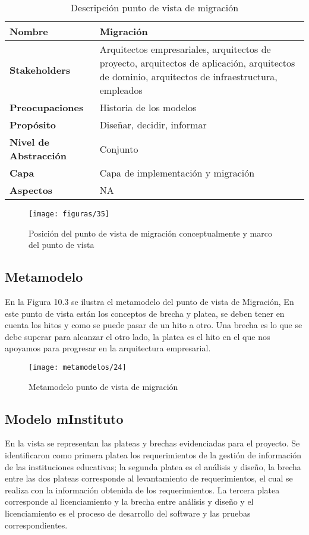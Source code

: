   \begin{table}[H]
	\centering
	\begin{tabular}{p{3.7cm}p{8cm}}
		\hline
		\rowcolor[HTML]{0073a1}
		{\color[HTML]{FFFFFF} \textbf{Nombre}} & {\color[HTML]{FFFFFF} \textbf{Migración}} \\
		\hline
		\textbf{Stakeholders} & Arquitectos empresariales, arquitectos de proyecto, arquitectos de aplicación, arquitectos de dominio, arquitectos de infraestructura, empleados \\
		\textbf{Preocupaciones} & Historia de los modelos \\
		\textbf{Propósito} & Diseñar, decidir, informar \\
		\textbf{Nivel de Abstracción} & Conjunto \\
		\textbf{Capa} & Capa de implementación y migración \\
		\textbf{Aspectos} & NA \\
		\bottomrule
	\end{tabular}
	\captionsetup{width=.95\textwidth}
	\caption{Descripción punto de vista de migración}
	\label{tabla27}
  \end{table}

  \begin{figure}[H]
	\centering
	\texttt{[image: figuras/35]}
	\captionsetup{width=.95\textwidth}
	\caption{Posición del punto de vista de migración conceptualmente y marco del punto de vista}
	\label{figura36}
  \end{figure}

  \subsection{Metamodelo}
  En la Figura 10.3 se ilustra el metamodelo del punto de vista de Migración, En este punto de vista están los conceptos de brecha y platea, se deben tener en cuenta los hitos y como se puede pasar de un hito a otro. Una brecha es lo que se debe superar para alcanzar el otro lado, la platea es el hito en el que nos apoyamos para progresar en la arquitectura empresarial.

  \begin{figure}[H]
	\centering
	\texttt{[image: metamodelos/24]}
	\captionsetup{width=.95\textwidth}
	\caption{Metamodelo punto de vista de migración}
	\label{metamodelo24}
  \end{figure}

  \subsection{Modelo mInstituto}
  En la vista se representan las plateas y brechas evidenciadas para el proyecto.  Se identificaron como primera platea los requerimientos de la gestión de información de las instituciones educativas; la segunda platea es el análisis y diseño, la brecha entre las dos plateas corresponde al levantamiento de requerimientos, el cual se realiza con la información obtenida de los requerimientos.  La tercera platea corresponde al licenciamiento y la brecha entre análisis y diseño y el licenciamiento es el proceso de desarrollo del software y las pruebas correspondientes.
  
